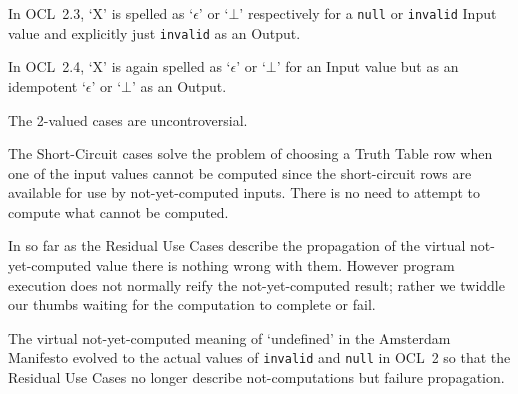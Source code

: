 \documentclass{jot}
\begin{document}
In OCL~2.3, `X' is spelled as `$\epsilon$' or `$\bot$' respectively for a \verb$null$ or \verb$invalid$ Input value and explicitly just \verb$invalid$ as an Output.

In OCL~2.4, `X' is again spelled as `$\epsilon$' or `$\bot$' for an Input value but as an idempotent `$\epsilon$' or `$\bot$' as an Output.

The 2-valued cases are uncontroversial.

The Short-Circuit cases solve the problem of choosing a Truth Table row when one of the input values cannot be computed since the short-circuit rows are available for use by not-yet-computed inputs. There is no need to attempt to compute what cannot be computed.


In so far as the Residual Use Cases describe the propagation of the virtual not-yet-computed value there is nothing wrong with them. However program execution does not normally reify the not-yet-computed result; rather we twiddle our thumbs waiting for the computation to complete or fail.

The virtual not-yet-computed meaning of `undefined' in the Amsterdam Manifesto evolved to the actual values of \verb$invalid$ and \verb$null$ in OCL~2 so that the Residual Use Cases no longer describe not-computations but failure propagation. %
\end{document}
